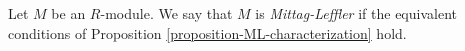\begin{definition}
\label{definition-mittag-leffler-module}
Let $M$ be an $R$-module.  We say that $M$ is {\it Mittag-Leffler} if the
equivalent conditions of
Proposition \ref{proposition-ML-characterization}
hold.
\end{definition}